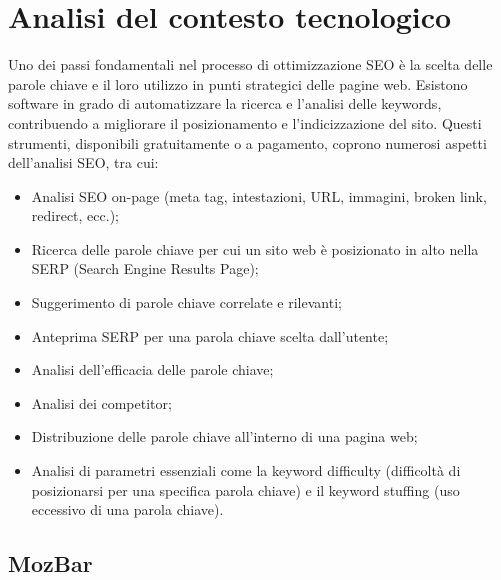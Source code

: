 \chapter{Analisi del contesto tecnologico}
\label{cap:analisi-soluzioni-esistenti}

\par Uno dei passi fondamentali nel processo di ottimizzazione SEO è la scelta delle parole chiave e il loro utilizzo in punti strategici delle pagine web. Esistono software in grado di automatizzare la ricerca e l’analisi delle keywords, contribuendo a migliorare il posizionamento e l’indicizzazione del sito. Questi strumenti, disponibili gratuitamente o a pagamento, coprono numerosi aspetti dell’analisi SEO, tra cui:
\begin{itemize}
    \item Analisi SEO on-page (meta tag, intestazioni, URL, immagini, broken link, redirect, ecc.);
    \item Ricerca delle parole chiave per cui un sito web è posizionato in alto nella SERP (Search Engine Results Page);
    \item Suggerimento di parole chiave correlate e rilevanti;
    \item Anteprima SERP per una parola chiave scelta dall'utente;
    \item Analisi dell’efficacia delle parole chiave;
    \item Analisi dei competitor;
    \item Distribuzione delle parole chiave all’interno di una pagina web;
    \item Analisi di parametri essenziali come la keyword difficulty (difficoltà di posizionarsi per una specifica parola chiave) e il keyword stuffing (uso eccessivo di una parola chiave).
\end{itemize}

\section{MozBar}


